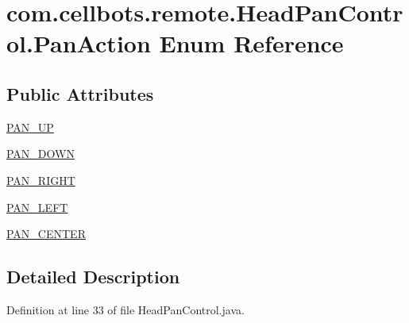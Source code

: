 \hypertarget{enumcom_1_1cellbots_1_1remote_1_1_head_pan_control_1_1_pan_action}{\section{com.\-cellbots.\-remote.\-Head\-Pan\-Control.\-Pan\-Action Enum Reference}
\label{enumcom_1_1cellbots_1_1remote_1_1_head_pan_control_1_1_pan_action}
}
\subsection*{Public Attributes}
\begin{DoxyCompactItemize}
\item 
\hyperlink{enumcom_1_1cellbots_1_1remote_1_1_head_pan_control_1_1_pan_action_ab880e11e29262964beab82cb4ba1e177}{P\-A\-N\-\_\-\-U\-P}
\item 
\hyperlink{enumcom_1_1cellbots_1_1remote_1_1_head_pan_control_1_1_pan_action_a757d9dbf8e00d1860f95e819245461fd}{P\-A\-N\-\_\-\-D\-O\-W\-N}
\item 
\hyperlink{enumcom_1_1cellbots_1_1remote_1_1_head_pan_control_1_1_pan_action_aba976f4c139d1aabf0cfc011dfcb7125}{P\-A\-N\-\_\-\-R\-I\-G\-H\-T}
\item 
\hyperlink{enumcom_1_1cellbots_1_1remote_1_1_head_pan_control_1_1_pan_action_a0457f9cfb9e41f2a47c16a5dc048b270}{P\-A\-N\-\_\-\-L\-E\-F\-T}
\item 
\hyperlink{enumcom_1_1cellbots_1_1remote_1_1_head_pan_control_1_1_pan_action_aad5ccfd4c2fd3246cd1e228b783fd93c}{P\-A\-N\-\_\-\-C\-E\-N\-T\-E\-R}
\end{DoxyCompactItemize}


\subsection{Detailed Description}


Definition at line 33 of file Head\-Pan\-Control.\-java.



